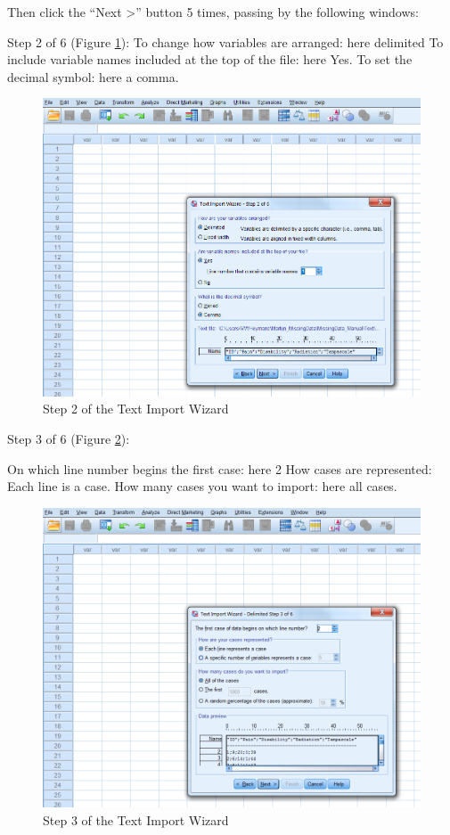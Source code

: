 \documentclass[
]{book}
\begin{document}
Then click the ``Next \textgreater{}'' button 5 times, passing by the following windows:

Step 2 of 6 (Figure \ref{fig:fig20}):
To change how variables are arranged: here delimited
To include variable names included at the top of the file: here Yes.
To set the decimal symbol: here a comma.

\begin{figure}

{\centering \includegraphics[width=0.95\linewidth]{images/fig1.20} 

}

\caption{Step 2 of the Text Import Wizard}\label{fig:fig20}
\end{figure}

Step 3 of 6 (Figure \ref{fig:fig21}):

On which line number begins the first case: here 2
How cases are represented: Each line is a case.
How many cases you want to import: here all cases.

\begin{figure}

{\centering \includegraphics[width=0.95\linewidth]{images/fig1.21} 

}

\caption{Step 3 of the Text Import Wizard}\label{fig:fig21}
\end{figure}
\end{document}
